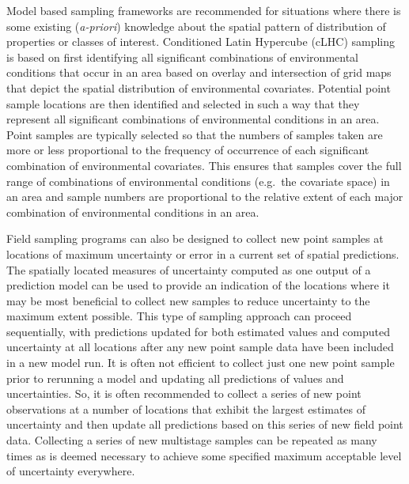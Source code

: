\documentclass[graybox,natbib,nospthms,UStrade]{svmono}
\begin{document}
Model based sampling frameworks are recommended for situations where
there is some existing (\emph{a-priori}) knowledge about the spatial pattern
of distribution of properties or classes of interest. Conditioned Latin
Hypercube (cLHC) sampling is based on first identifying all significant
combinations of environmental conditions that occur in an area based on
overlay and intersection of grid maps that depict the spatial
distribution of environmental covariates. Potential point sample
locations are then identified and selected in such a way that they
represent all significant combinations of environmental conditions in an
area. Point samples are typically selected so that the numbers of
samples taken are more or less proportional to the frequency of
occurrence of each significant combination of environmental covariates.
This ensures that samples cover the full range of combinations of
environmental conditions (e.g.~the covariate space) in an area and
sample numbers are proportional to the relative extent of each major
combination of environmental conditions in an area.

Field sampling programs can also be designed to collect new point
samples at locations of maximum uncertainty or error in a current set of
spatial predictions. The spatially located measures of uncertainty
computed as one output of a prediction model can be used to provide an
indication of the locations where it may be most beneficial to collect
new samples to reduce uncertainty to the maximum extent possible. This
type of sampling approach can proceed sequentially, with predictions
updated for both estimated values and computed uncertainty at all
locations after any new point sample data have been included in a new
model run. It is often not efficient to collect just one new point
sample prior to rerunning a model and updating all predictions of values
and uncertainties. So, it is often recommended to collect a series of
new point observations at a number of locations that exhibit the largest
estimates of uncertainty and then update all predictions based on this
series of new field point data. Collecting a series of new multistage
samples can be repeated as many times as is deemed necessary to achieve
some specified maximum acceptable level of uncertainty everywhere.
\end{document}
